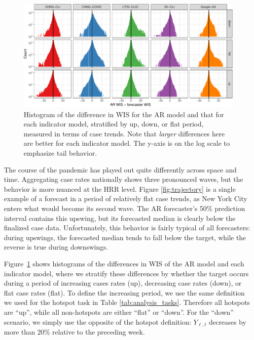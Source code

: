 \documentclass[9pt,twocolumn,twoside,lineno]{pnas-new}
\begin{document}
\begin{figure}[t]
  \includegraphics[width=\textwidth]{fig/upswing-histogram-1.pdf}
  \caption{Histogram of the difference in WIS for the AR model and that for each
    indicator model, stratified by up, down, or flat period, measured in terms
    of case trends. Note that \textit{larger} differences here are better for
    each indicator model.  The y-axis is on the log scale to emphasize tail 
    behavior.}   
  \label{fig:up_down_flat}
\end{figure}

The course of the pandemic has played out quite differently across space and
time. Aggregating case rates nationally shows three pronounced waves, but the
behavior is more nuanced at the HRR level.  Figure \ref{fig:trajectory} is a
single example of a forecast in a period of relatively flat case trends, as New
York City enters what would become its second wave. The AR forecaster's 50\%
prediction interval contains this upswing, but its forecasted median is clearly
below the finalized case data.  Unfortunately, this behavior is fairly typical
of all forecasters: during upswings, the forecasted median tends to fall below 
the target, while the reverse is true during downswings.

Figure~\ref{fig:up_down_flat} shows histograms of the differences in WIS of the 
AR model and each indicator model, where we stratify these differences by
whether the target occurs during a period of increasing cases rates (up),
decreasing case rates (down), or flat case rates (flat). To define the
increasing period, we use the same definition we used for the hotspot task in
Table \ref{tab:analysis_tasks}.  Therefore all hotspots are ``up'', while all
non-hotspots are either ``flat'' or ``down''.  For the ``down'' scenario, we 
simply use the opposite of the hotspot definition: $Y_{\ell,t}$ decreases by
more than 20\% relative to the preceding week.  
\end{document}
